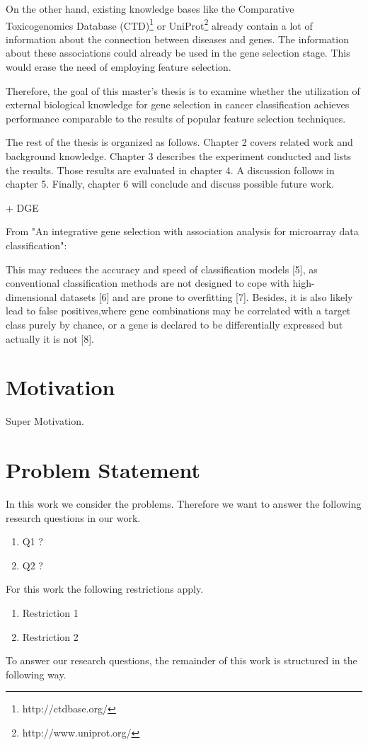On the other hand, 	existing knowledge bases like the Comparative Toxicogenomics Database (CTD)\footnote{http://ctdbase.org/} or UniProt\footnote{http://www.uniprot.org/} already contain a lot of information about the connection between diseases and genes. The information about these associations could already be used in the gene selection stage. This would erase the need of employing feature selection.

Therefore, the goal of this master's thesis is to examine whether the utilization of external biological knowledge for gene selection in cancer classification achieves performance comparable to the results of popular feature selection techniques. 

The rest of the thesis is organized as follows. Chapter 2 covers related work and background knowledge. Chapter 3 describes the experiment conducted and lists the results. Those results are evaluated in chapter 4. A discussion follows in chapter 5. Finally, chapter 6 will conclude and discuss possible future work.

+ DGE

From "An integrative gene selection with association analysis for microarray data classification":

This may reduces the accuracy and speed of classification models [5], as conventional classification methods are not designed to cope with high-dimensional datasets [6] and are prone to overfitting [7]. Besides, it is also likely lead to false positives,where gene combinations may be correlated with a target class purely by chance, or a gene is declared to be differentially expressed but actually it is not [8].

\chapter{Motivation}
\label{chapter:Motivation}

Super Motivation.
\chapter{Problem Statement}
\label{chapter:problemStatement}

In this work we consider the problems.
Therefore we want to answer the following research questions in our work.
\begin{enumerate}
\item Q1 ?
\item Q2 ?
\end{enumerate}

For this work the following restrictions apply.
\begin{enumerate}
	\item Restriction 1
	\item Restriction 2
\end{enumerate}

To answer our research questions, the remainder of this work is structured in the following way.
